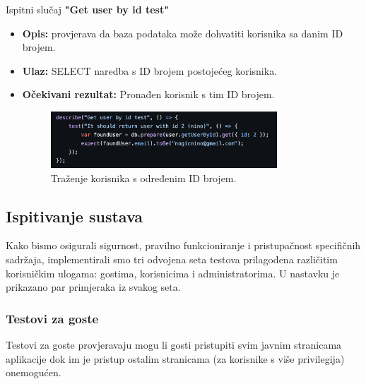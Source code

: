 			Ispitni slučaj \textbf{"Get user by id test"}
			\begin{itemize}
				\item \textbf{Opis:} provjerava da baza podataka može dohvatiti korisnika sa danim ID brojem.
				\item \textbf{Ulaz:} SELECT naredba s ID brojem postojećeg korisnika.
				\item \textbf{Očekivani rezultat:} Pronađen korisnik s tim ID brojem.
				\begin{figure}[h]
					\centering
					\includegraphics[width=0.8\textwidth]{slike/testovi/db_user_id_test.png}
					\caption{Traženje korisnika s određenim ID brojem.}
					\label{fig:testovi_db}
				\end{figure}
			\end{itemize}
			\newpage
			
			
			\subsection{Ispitivanje sustava}
			
			Kako bismo osigurali sigurnost, pravilno funkcioniranje i pristupačnost specifičnih sadržaja, 
			implementirali smo tri odvojena seta testova prilagođena različitim korisničkim ulogama: gostima, korisnicima i administratorima.
			U nastavku je prikazano par primjeraka iz svakog seta. 

			\subsubsection{Testovi za goste}
			Testovi za goste provjeravaju mogu li gosti pristupiti svim javnim stranicama aplikacije dok im je pristup ostalim stranicama (za korisnike s više privilegija) onemogućen.
			\\

